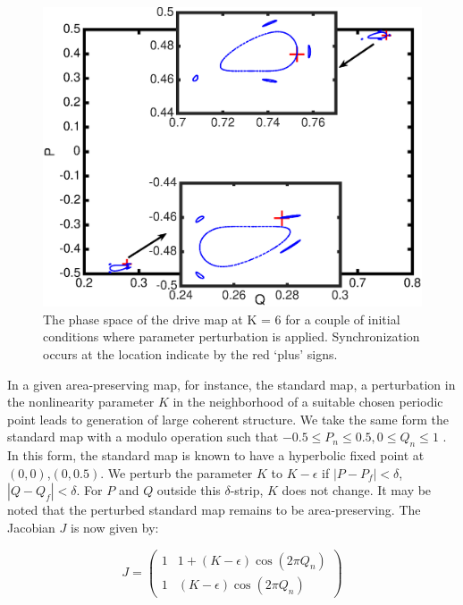 \documentclass[reprint,superscriptaddress,amsmath,amssymb,aps,pre]{revtex4-1}
\begin{document}
\begin{figure}[t]
    \includegraphics[scale=0.5]{Fast_sync_location.eps}
    \caption{\label{fig:location}\footnotesize The phase space of the drive 
        map at K = 6 for a couple of initial conditions where parameter 
        perturbation is applied. Synchronization occurs at the location 
        indicate 
        by the red `plus' signs.}
\end{figure}
In a given area-preserving map, for instance, the  standard map, a  
perturbation in the nonlinearity parameter $K$ in the neighborhood of a 
suitable chosen periodic point leads to generation of large coherent 
structure.   We take the same form the standard map with a modulo operation 
such that $-0.5 \leq P_n \leq 0.5, 0\leq Q_n \leq 1$ . In this form, the 
standard map is known to have a hyperbolic fixed point at 
$(0,0)$,$(0,0.5)$. We perturb the parameter $K$ to $K-\epsilon$ if $|P - P_f| 
< \delta$, $|Q-Q_f| < \delta$. For $P$ and $Q$ outside this $\delta$-strip, 
$K$ does not change.  It may be noted that the perturbed standard map remains 
to be area-preserving. The Jacobian $J$ is now given by: 

\begin{minipage}[t]{0.45\textwidth}
	\centering
	\[ J = \left( \begin{array}{cc}
	1 & 1 + (K-\epsilon)\cos(2\pi Q_n)   \\
	1 & (K-\epsilon)\cos(2\pi Q_n) \end{array} \right)\] 
\end{minipage}
\end{document}
